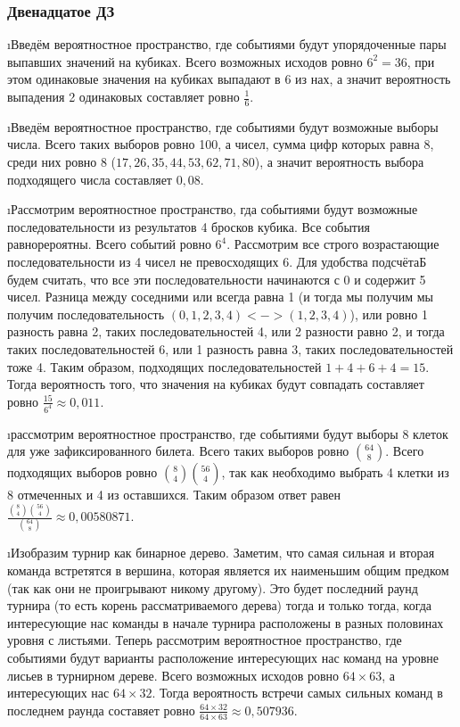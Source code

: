 \subsubsection{Двенадцатое ДЗ}

\i Введём вероятностное пространство, где событиями будут упорядоченные пары выпавших значений на кубиках. Всего возможных исходов ровно $6^2 = 36$, при этом одинаковые значения на кубиках выпадают в $6$ из нах, а значит вероятность выпадения 2 одинаковых составляет ровно $\frac{1}{6}$.

\i Введём вероятностное пространство, где событиями будут возможные выборы числа. Всего таких выборов ровно 100, а чисел, сумма цифр которых равна 8, среди них ровно $8$ ($17, 26, 35, 44, 53, 62, 71, 80$), а значит вероятность выбора подходящего числа составляет $0{,}08$.

\i Рассмотрим вероятностное пространство, гда событиями будут возможные последовательности из результатов 4 бросков кубика. Все события равнорероятны. Всего событий ровно $6^4$. Рассмотрим все строго возрастающие последовательности из 4 чисел не превосходящих 6. Для удобства подсчётаБ будем считать, что все эти последовательности начинаются с 0 и содержит 5 чисел. Разница между соседними или всегда равна 1 (и тогда мы получим мы получим последовательность $(0, 1, 2, 3, 4) <-> (1, 2, 3, 4)$), или ровно 1 разность равна 2, таких последовательностей 4, или 2 разности равно 2, и тогда таких последовательностей 6, или 1 разность равна 3, таких последовательностей тоже 4. Таким образом, подходящих последовательностей $1+4+6+4 = 15$. Тогда вероятность того, что значения на кубиках будут совпадать составляет ровно $\frac{15}{6^4} \approx 0,011$.

\i рассмотрим вероятностное пространство, где событиями будут выборы 8 клеток для уже зафиксированного билета. Всего таких выборов ровно $\binom{64}{8}$. Всего подходящих выборов ровно $\binom{8}{4}\binom{56}{4}$, так как необходимо выбрать 4 клетки из 8 отмеченных и 4 из оставшихся. Таким образом ответ равен $\frac{\binom{8}{4}\binom{56}{4}}{\binom{64}{8}} \approx 0{,}00580871$.

\i Изобразим турнир как бинарное дерево. Заметим, что самая сильная и вторая команда встретятся в вершина, которая является их наименьшим общим предком (так как они не проигрывают никому другому). Это будет последний раунд турнира (то есть корень рассматриваемого дерева) тогда и только тогда, когда интересующие нас команды в начале турнира расположены в разных половинах уровня с листьями. Теперь рассмотрим вероятностное пространство, где событиями будут варианты расположение интересующих нас команд на уровне лисьев в турнирном дереве. Всего возможных исходов ровно $64 \times 63$, а интересующих нас $64 \times 32$. Тогда вероятность встречи самых сильных команд в последнем раунда составяет ровно $\frac{64\times32}{64\times63} \approx 0{,}507936$.


